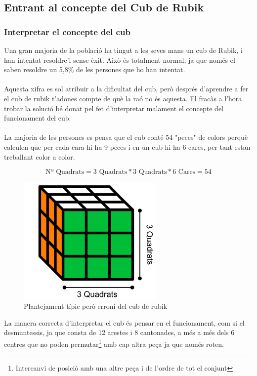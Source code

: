 \subsection{Entrant al concepte del Cub de Rubik}

\subsubsection{Interpretar el concepte del cub}

Una gran majoria de la població ha tingut a les seves mans un cub de Rubik, i han intentat resoldre'l sense èxit. Això és totalment normal, ja que només el saben resoldre un 5,8\% de les persones que ho han intentat\cite{redbull-cub}.
\\\\Aquesta xifra es sol atribuir a la dificultat del cub, però després d'aprendre a fer el cub de rubik t'adones compte de què la raó no és aquesta. El fracàs a l'hora trobar la solució bé donat pel fet d'interpretar malament el concepte del funcionament del cub.
\\\\La majoria de les persones es pensa que el cub conté 54 "peces" de colors perquè calculen que per cada cara hi ha 9 peces i en un cub hi ha 6 cares, per tant estan treballant color a color.

$$ \textrm{Nº Quadrats} = 3\textrm{ Quadrats}*3\textrm{ Quadrats}*6\textrm{ Cares} = 54 $$

\begin{figure}[ht]
    \centering
    \includegraphics[width=7cm]{img/figures/plantejament-no.png}
    \caption{Plantejament típic però erroni del cub de rubik}
    \label{fig:plantejament-no}
\end{figure}

La manera correcta d'interpretar el cub és pensar en el funcionament, com si el desmuntessis, ja que consta de 12 arestes i 8 cantonades, a més a més dels 6 centres que no poden permutar\footnote{Intercanvi de posició amb una altre peça i de l'ordre de tot el conjunt} amb cap altra peça ja que només roten.

